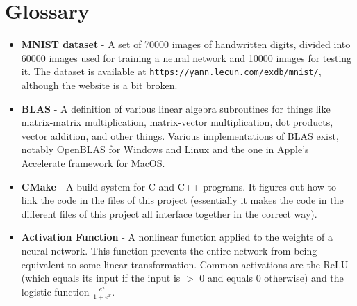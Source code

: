 \documentclass[12pt]{article}
\begin{document}
\section{Glossary}

\begin{itemize}
    \item \textbf{MNIST dataset} - 
    A set of 70000 images of handwritten digits, divided into 60000 images used for training a neural network and 10000 images for testing it. 
    The dataset is available at \verb|https://yann.lecun.com/exdb/mnist/|, although the website is a bit broken. 
    \item \textbf{BLAS} - 
    A definition of various linear algebra subroutines for things like matrix-matrix multiplication, matrix-vector multiplication, dot products, vector addition, and other things.
    Various implementations of BLAS exist, notably OpenBLAS for Windows and Linux and the one in Apple's Accelerate framework for MacOS.
    \item \textbf{CMake} -
    A build system for C and C++ programs.
    It figures out how to link the code in the files of this project (essentially it makes the code in the different files of this project all interface together in the correct way).
    \item \textbf{Activation Function} - 
    A nonlinear function applied to the weights of a neural network.
    This function prevents the entire network from being equivalent to some linear transformation.
    Common activations are the ReLU (which equals its input if the input is $>$ 0 and equals 0 otherwise) and the logistic function $\frac{e^x}{1+e^x}$.
\end{itemize}
\end{document}
